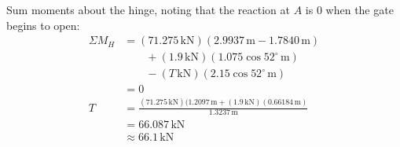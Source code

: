 \documentclass[10pt,onesided]{amsart}
\begin{document}
\begin{minipage}[t]{0.55\textwidth}
{		Sum moments about the hinge, noting that the reaction at $A$ is $0$ when the gate begins to open:
		\begin{align*}
			\Sigma M_H & =(71.275\,\text{kN})(2.9937\,\text{m}-1.7840\,\text{m})                                             \\
			           & \qquad +(1.9\,\text{kN})(1.075\cos52^\circ\,\text{m})                                               \\
			           & \qquad -(T\,\text{kN})(2.15\cos52^\circ\,\text{m})                                                  \\
			           & = 0                                                                                                 \\
			T          & = \frac{(71.275\,\text{kN})(1.2097\,\text{m}+(1.9\,\text{kN})(0.66184\,\text{m})}{1.3237\,\text{m}} \\
			           & = 66.087\,\text{kN}                                                                                 \\
			           & \approx 66.1\,\text{kN}                                                                             
		\end{align*}
	}
\end{minipage}
\newpage
\end{document}
